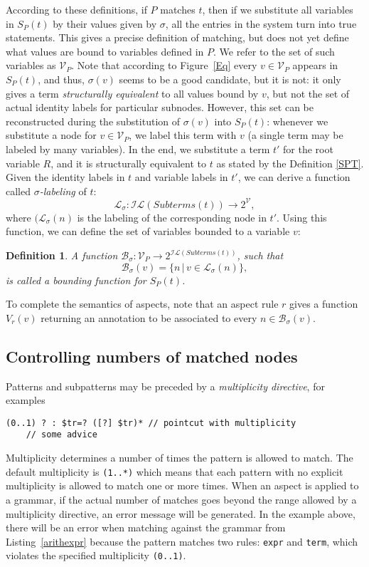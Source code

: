 \documentclass{IOS-Book-Article}     %
\newtheorem{Def}{Definition}
\newcommand{\lstref}[1]{Listing~\ref{#1}}
\newcommand{\figref}[1]{Figure~\ref{#1}}
\begin{document}
According to these definitions, if $P$ matches $t$, then if we substitute all variables in $S_P(t)$ by their values given by $\sigma$, all the entries in the system turn into true statements. This gives a precise definition of matching, but does not yet define what values are bound to variables defined in $P$. We refer to the set of such variables as $\mathcal{V}_P$. Note that according to \figref{Eq} every $v \in \mathcal{V}_P$ appears in $S_P(t)$, and thus, $\sigma(v)$ seems to be a good candidate, but it is not: it only gives a term \emph{structurally equivalent} to all values bound by $v$, but not the set of actual identity labels for particular subnodes. However, this set can be reconstructed during the substitution of $\sigma(v)$ into $S_P(t)$: whenever we substitute a node for $v \in \mathcal{V}_P$, we label this term with $v$ (a single term may be labeled by many variables). In the end, we substitute a term $t'$ for the root variable $R$, and it is structurally equivalent to $t$ as stated by the Definition \ref{SPT}. Given the identity labels in $t$ and variable labels in $t'$, we can derive a function called \emph{$\sigma$-labeling} of $t$:
$$\mathcal{L}_\sigma : \mathcal{IL}(Subterms(t)) \rightarrow 2^{\mathcal{V}},$$
where $(\mathcal{L}_\sigma(n)$ is the labeling of the corresponding node in $t'$. Using this function, we can define the set of variables bounded to a variable $v$:
\begin{Def}
A function $\mathcal{B}_\sigma : \mathcal{V}_P \rightarrow 2^{\mathcal{IL}(Subterms(t))}$, such that $$\mathcal{B}_\sigma(v) = \{n \,|\, v \in \mathcal{L}_\sigma(n)\},$$
is called a \emph{bounding function} for $S_P(t)$.
\end{Def}

To complete the semantics of aspects, note that an aspect rule $r$ gives a function $V_r(v)$ returning an annotation to be associated to every $n \in \mathcal{B}_\sigma(v)$.

\subsection{Controlling numbers of matched nodes}
Patterns and subpatterns may be preceded by a \emph{multiplicity directive}, for examples
\begin{lstlisting}[language=Grammatic]
(0..1) ? : $tr=? ([?] $tr)* // pointcut with multiplicity
    // some advice
\end{lstlisting}
Multiplicity determines a number of times the pattern is allowed to match. The default multiplicity is \texttt{(1..*)} which means that each pattern with no explicit multiplicity is allowed to match one or more times. When an aspect is applied to a grammar, if the actual number of matches goes beyond the range allowed by a multiplicity directive, an error message will be generated. In the example above, there will be an error when matching against the grammar from \lstref{arithexpr} because the pattern matches two rules: \texttt{expr} and \texttt{term}, which violates the specified multiplicity \texttt{(0..1)}.
\end{document}
